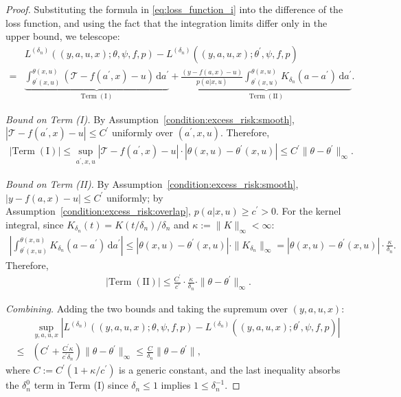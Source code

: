 \documentclass[12pt]{article}
\begin{document}
\begin{proof}
Substituting the formula in \eqref{eq:loss_function_i} into the difference of the loss function, and using the fact that the integration limits differ only in the upper bound, we telescope:
\begin{align*}
    &L^{(\delta_n)}((y,a,u,x);\theta,\psi,f,p) - L^{(\delta_n)}((y,a,u,x);\theta^\prime,\psi,f,p)\\
    = & \underbrace{\int_{\theta^\prime(x,u)}^{\theta(x,u)}(\mathcal{T} - f(a^\prime,x)-u)\,\mathrm{d}a^\prime}_{\mathrm{Term\;(I)}}
    + \underbrace{\frac{(y - f(a,x)-u)}{p(a|x,u)}\int_{\theta^\prime(x,u)}^{\theta(x,u)}K_{\delta_n}(a-a^\prime)\,\mathrm{d}a^\prime}_{\mathrm{Term\;(II)}}.
\end{align*}

\noindent\textit{Bound on Term (I).}  By Assumption~\ref{condition:excess_risk:smooth}, $|\mathcal{T} - f(a^\prime,x) - u|\leq C^\prime$ uniformly over $(a^\prime,x,u)$. Therefore,
\begin{align*}
    |\mathrm{Term\;(I)}| \leq \sup_{a^\prime,x,u}|\mathcal{T}-f(a^\prime,x)-u|\cdot|\theta(x,u)-\theta^\prime(x,u)| \leq C^\prime\|\theta-\theta^\prime\|_\infty.
\end{align*}

\noindent\textit{Bound on Term (II).}
By Assumption~\ref{condition:excess_risk:smooth}, $|y-f(a,x)-u|\leq C^\prime$ uniformly; by Assumption~\ref{condition:excess_risk:overlap}, $p(a|x,u)\geq c^\prime>0$. For the kernel integral, since $K_{\delta_n}(t)=K(t/\delta_n)/\delta_n$ and $\kappa:=\|K\|_\infty<\infty$:
\begin{align*}
    \left|\int_{\theta^\prime(x,u)}^{\theta(x,u)}K_{\delta_n}(a-a^\prime)\,\mathrm{d}a^\prime\right|
    \leq |\theta(x,u)-\theta^\prime(x,u)|\cdot\|K_{\delta_n}\|_\infty
    = |\theta(x,u)-\theta^\prime(x,u)|\cdot\frac{\kappa}{\delta_n}.
\end{align*}
Therefore,
\begin{align*}
    |\mathrm{Term\;(II)}| \leq \frac{C^\prime}{c^\prime}\cdot\frac{\kappa}{\delta_n}\cdot\|\theta-\theta^\prime\|_\infty.
\end{align*}

\noindent\textit{Combining.}
Adding the two bounds and taking the supremum over $(y,a,u,x)$:
\begin{align*}
    &\sup_{y,a,u,x}\left|L^{(\delta_n)}((y,a,u,x);\theta,\psi,f,p) - L^{(\delta_n)}((y,a,u,x);\theta^\prime,\psi,f,p)\right|\\
    \leq &\left(C^\prime + \frac{C^\prime\kappa}{c^\prime\delta_n}\right)\|\theta-\theta^\prime\|_\infty
    \leq \frac{C}{\delta_n}\|\theta-\theta^\prime\|,
\end{align*}
where $C:=C^\prime(1+\kappa/c^\prime)$ is a generic constant, and the last inequality absorbs the $\delta_n^0$ term in Term (I) since $\delta_n\leq 1$ implies $1\leq \delta_n^{-1}$.
\end{proof}
\end{document}

